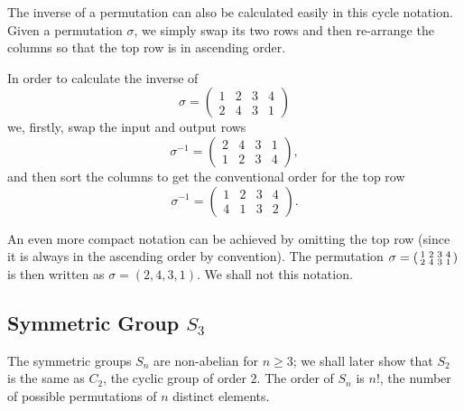 \documentclass[11pt]{penrose}
\begin{document}
The inverse of a permutation can also be calculated easily in this cycle notation. Given a permutation $\sigma$, we simply swap its two rows and then re-arrange the columns so that the top row is in ascending order.
\begin{negg}
    In order to calculate the inverse of
    \begin{equation*}
        \sigma = \begin{pmatrix} 1 & 2 & 3 & 4 \\ 2 & 4 & 3 & 1 \end{pmatrix}
    \end{equation*}
    we, firstly, swap the input and output rows
    \begin{equation*}
        \sigma^{-1} = \begin{pmatrix} 2 & 4 & 3 & 1 \\ 1 & 2 & 3 & 4 \end{pmatrix},
    \end{equation*}
    and then sort the columns to get the conventional order for the top row
    \begin{equation*}
        \sigma^{-1} = \begin{pmatrix} 1 & 2 & 3 & 4 \\ 4 & 1 & 3 & 2 \end{pmatrix}.
    \end{equation*}
\end{negg}

An even more compact notation can be achieved by omitting the top row (since it is always in the ascending order by convention). The permutation $\sigma = \begin{psmallmatrix} 1 & 2 & 3 & 4 \\ 2 & 4 & 3 & 1 \end{psmallmatrix}$ is then written as $\sigma = (2, 4, 3, 1)$. We shall not this notation.

\subsection{Symmetric Group \texorpdfstring{$S_3$}{S3}}
The symmetric groups $S_n$ are non-abelian for $n \geq 3$; we shall later show that $S_2$ is the same as $C_2$, the cyclic group of order $2$. The order of $S_n$ is $n!$, the number of possible permutations of $n$ distinct elements.
\end{document}
